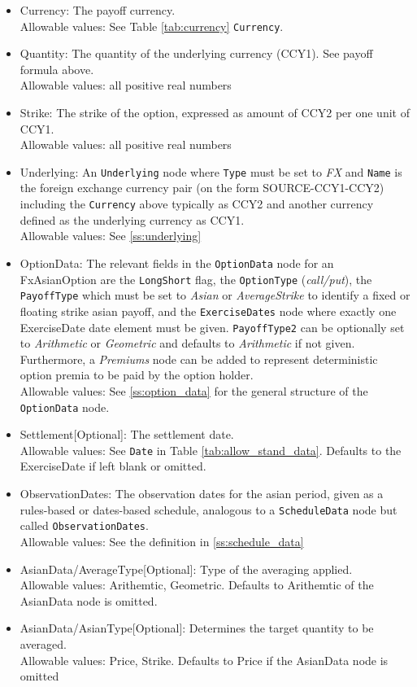 \begin{itemize}
	\item Currency: The payoff currency. \\  %
	Allowable values: See Table \ref{tab:currency} \lstinline!Currency!.
	\item Quantity: The quantity of the underlying currency (CCY1). See payoff formula above.  \\
	Allowable values: all positive real numbers
	\item Strike: The strike of the option, expressed as amount of CCY2 per one unit of CCY1. \\
	Allowable values: all positive real numbers
	\item Underlying: An \lstinline!Underlying! node where \lstinline!Type! must be set to \emph{FX} and \lstinline!Name! is the foreign exchange currency pair (on the form SOURCE-CCY1-CCY2) including the \lstinline!Currency! above typically as CCY2 and another currency defined as the underlying currency as CCY1.   \\
	Allowable values:  See \ref{ss:underlying}
	\item OptionData: The relevant fields in the \lstinline!OptionData! node for an FxAsianOption are the \lstinline!LongShort! flag, the \lstinline!OptionType! (\emph{call/put}), the \lstinline!PayoffType! which must be set to \emph{Asian} or \emph{AverageStrike} to
	identify a fixed or floating strike asian payoff, and the \lstinline!ExerciseDates! node where exactly one ExerciseDate date element must be given. \lstinline!PayoffType2! can be optionally set to \emph{Arithmetic} or \emph{Geometric} and defaults to \emph{Arithmetic} if not given. Furthermore, a \emph{Premiums} node can be added to represent deterministic option premia to be paid by the option holder. \\
	Allowable values: See \ref{ss:option_data} for the general structure of the \lstinline!OptionData! node.
	\item Settlement[Optional]: The settlement date.  \\
	Allowable values: See \lstinline!Date! in Table \ref{tab:allow_stand_data}. Defaults to the ExerciseDate if left blank or omitted.
	\item ObservationDates: The observation dates for the asian period, given as a rules-based or dates-based schedule, analogous to a \lstinline!ScheduleData! node but called \lstinline!ObservationDates!.  \\
	Allowable values: See the definition in \ref{ss:schedule_data}
	\item AsianData/AverageType[Optional]: Type of the averaging applied. \\
        Allowable values: Arithemtic, Geometric. Defaults to Arithemtic of the AsianData node is omitted.
	\item AsianData/AsianType[Optional]: Determines the target quantity to be averaged. \\
        Allowable values: Price, Strike. Defaults to Price if the AsianData node is omitted
\end{itemize}
